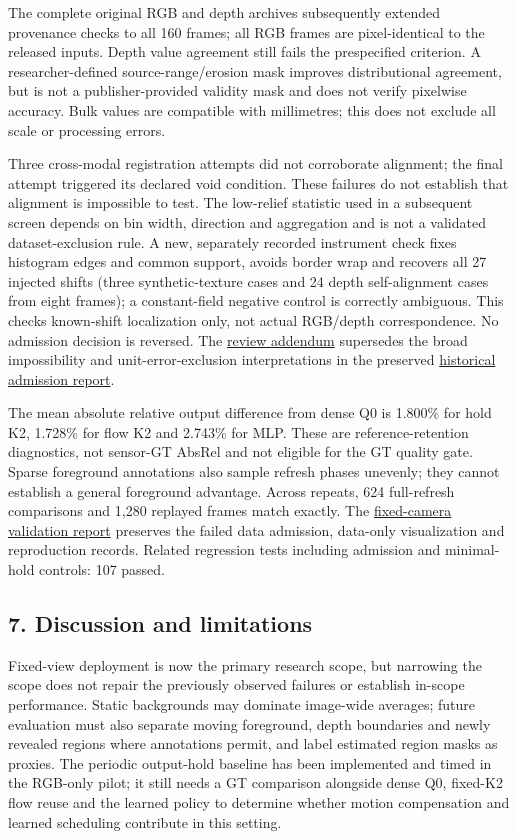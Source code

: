 \documentclass[
  10pt,
]{article}
\begin{document}
The complete original RGB and depth archives subsequently extended
provenance checks to all 160 frames; all RGB frames are pixel-identical
to the released inputs. Depth value agreement still fails the
prespecified criterion. A researcher-defined source-range/erosion mask
improves distributional agreement, but is not a publisher-provided
validity mask and does not verify pixelwise accuracy. Bulk values are
compatible with millimetres; this does not exclude all scale or
processing errors.

Three cross-modal registration attempts did not corroborate alignment;
the final attempt triggered its declared void condition. These failures
do not establish that alignment is impossible to test. The low-relief
statistic used in a subsequent screen depends on bin width, direction
and aggregation and is not a validated dataset-exclusion rule. A new,
separately recorded instrument check fixes histogram edges and common
support, avoids border wrap and recovers all 27 injected shifts (three
synthetic-texture cases and 24 depth self-alignment cases from eight
frames); a constant-field negative control is correctly ambiguous. This
checks known-shift localization only, not actual RGB/depth
correspondence. No admission decision is reversed. The
\href{streaming_draft/FIXED_CAMERA_REVIEW.md}{review addendum}
supersedes the broad impossibility and unit-error-exclusion
interpretations in the preserved
\href{streaming_draft/FIXED_CAMERA_REFERENCE_ADMISSION.md}{historical
admission report}.

The mean absolute relative output difference from dense Q0 is 1.800\%
for hold K2, 1.728\% for flow K2 and 2.743\% for MLP. These are
reference-retention diagnostics, not sensor-GT AbsRel and not eligible
for the GT quality gate. Sparse foreground annotations also sample
refresh phases unevenly; they cannot establish a general foreground
advantage. Across repeats, 624 full-refresh comparisons and 1,280
replayed frames match exactly. The
\href{streaming_draft/FIXED_CAMERA_VALIDATION.md}{fixed-camera
validation report} preserves the failed data admission, data-only
visualization and reproduction records. Related regression tests
including admission and minimal-hold controls: 107 passed.

\subsection{7. Discussion and
limitations}\label{discussion-and-limitations}

Fixed-view deployment is now the primary research scope, but narrowing
the scope does not repair the previously observed failures or establish
in-scope performance. Static backgrounds may dominate image-wide
averages; future evaluation must also separate moving foreground, depth
boundaries and newly revealed regions where annotations permit, and
label estimated region masks as proxies. The periodic output-hold
baseline has been implemented and timed in the RGB-only pilot; it still
needs a GT comparison alongside dense Q0, fixed-K2 flow reuse and the
learned policy to determine whether motion compensation and learned
scheduling contribute in this setting.
\end{document}
